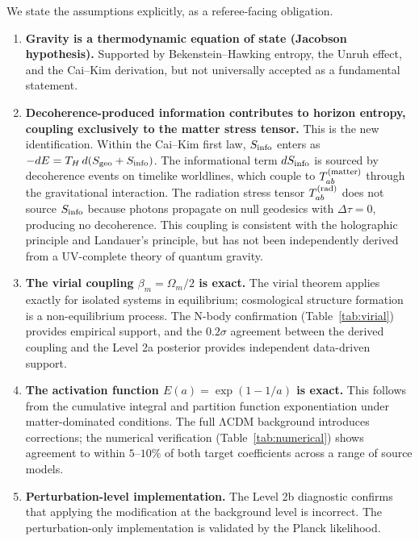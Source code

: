 \documentclass[twocolumn,a4paper,aps,prd,twocolumn,showpacs,notitlepage,superscriptaddress,nofootinbib]{article}
\newcommand{\betam}{\beta_{m}}
\begin{document}
We state the assumptions explicitly, as a referee-facing obligation.

\begin{enumerate}
  \item \textbf{Gravity is a thermodynamic equation of state (Jacobson
    hypothesis).}  Supported by Bekenstein--Hawking entropy, the Unruh effect,
    and the Cai--Kim derivation, but not universally accepted as a fundamental
    statement.

  \item \textbf{Decoherence-produced information contributes to horizon
    entropy, coupling exclusively to the matter stress tensor.}  This is
    the new identification.  Within the Cai--Kim first law,
    $S_{\rm info}$ enters as $-dE = T_H\,d(S_{\rm geo} + S_{\rm info})$.
    The informational term $dS_{\rm info}$ is sourced by decoherence events
    on timelike worldlines, which couple to $T_{ab}^{(\rm matter)}$ through
    the gravitational interaction.  The radiation stress tensor
    $T_{ab}^{(\rm rad)}$ does not source $S_{\rm info}$ because photons
    propagate on null geodesics with $\Delta\tau = 0$, producing no
    decoherence.  This coupling is consistent with the holographic principle
    and Landauer's principle, but has not been independently derived from a
    UV-complete theory of quantum gravity.

  \item \textbf{The virial coupling $\betam = \Omega_m/2$ is exact.}  The
    virial theorem applies exactly for isolated systems in equilibrium;
    cosmological structure formation is a non-equilibrium process.  The
    N-body confirmation (Table~\ref{tab:virial}) provides empirical support,
    and the $0.2\sigma$ agreement between the derived coupling and the
    Level 2a posterior provides independent data-driven support.

  \item \textbf{The activation function $E(a) = \exp(1-1/a)$ is exact.}  This
    follows from the cumulative integral and partition function exponentiation
    under matter-dominated conditions.  The full ΛCDM background introduces
    corrections; the numerical verification (Table~\ref{tab:numerical}) shows
    agreement to within $5$--$10\%$ of both target coefficients across a range
    of source models.

  \item \textbf{Perturbation-level implementation.}  The Level 2b diagnostic
    confirms that applying the modification at the background level is
    incorrect.  The perturbation-only implementation is validated by the
    Planck likelihood.
\end{enumerate}
\end{document}
